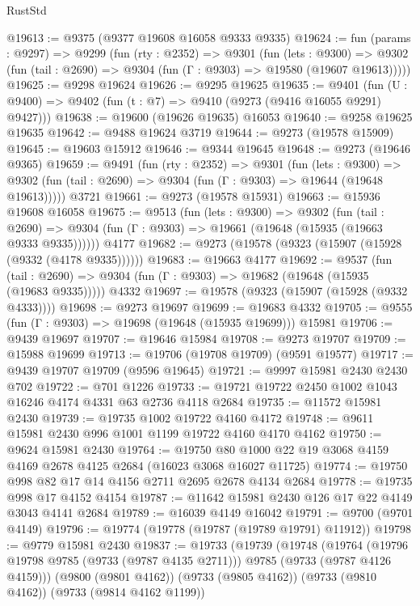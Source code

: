\begin{lexlean}{RustStd}
\begin{coremodule}
@19613 := @9375 (@9377 @19608 @16058 @9333 @9335)
@19624 := fun (params : @9297) =>
  @9299
    (fun (rty : @2352) =>
    @9301
      (fun (lets : @9300) =>
      @9302 (fun (tail : @2690) => @9304 (fun (Γ : @9303) => @19580 (@19607 @19613)))))
@19625 := @9298 @19624
@19626 := @9295 @19625
@19635 := @9401
    (fun (U : @9400) => @9402 (fun (t : @7) => @9410 (@9273 (@9416 @16055 @9291) @9427)))
@19638 := @19600 (@19626 @19635) @16053
@19640 := @9258 @19625 @19635
@19642 := @9488 @19624 @3719
@19644 := @9273 (@19578 @15909)
@19645 := @19603 @15912
@19646 := @9344 @19645
@19648 := @9273 (@19646 @9365)
@19659 := @9491
    (fun (rty : @2352) =>
    @9301
      (fun (lets : @9300) =>
      @9302 (fun (tail : @2690) => @9304 (fun (Γ : @9303) => @19644 (@19648 @19613)))))
    @3721
@19661 := @9273 (@19578 @15931)
@19663 := @15936 @19608 @16058
@19675 := @9513
    (fun (lets : @9300) =>
    @9302
      (fun (tail : @2690) =>
      @9304 (fun (Γ : @9303) => @19661 (@19648 (@15935 (@19663 @9333 @9335))))))
    @4177
@19682 := @9273 (@19578 (@9323 (@15907 (@15928 (@9332 (@4178 @9335))))))
@19683 := @19663 @4177
@19692 := @9537
    (fun (tail : @2690) => @9304 (fun (Γ : @9303) => @19682 (@19648 (@15935 (@19683 @9335)))))
    @4332
@19697 := @19578 (@9323 (@15907 (@15928 (@9332 @4333))))
@19698 := @9273 @19697
@19699 := @19683 @4332
@19705 := @9555 (fun (Γ : @9303) => @19698 (@19648 (@15935 @19699))) @15981
@19706 := @9439 @19697
@19707 := @19646 @15984
@19708 := @9273 @19707
@19709 := @15988 @19699
@19713 := @19706 (@19708 @19709) (@9591 @19577)
@19717 := @9439 @19707 @19709 (@9596 @19645)
@19721 := @9997 @15981 @2430 @2430 @702
@19722 := @701 @1226
@19733 := @19721 @19722 @2450 @1002 @1043 @16246 @4174 @4331 @63 @2736 @4118 @2684
@19735 := @11572 @15981 @2430
@19739 := @19735 @1002 @19722 @4160 @4172
@19748 := @9611 @15981 @2430 @996 @1001 @1199 @19722 @4160 @4170 @4162
@19750 := @9624 @15981 @2430
@19764 := @19750 @80 @1000 @22 @19 @3068 @4159 @4169 @2678 @4125 @2684 (@16023 @3068 @16027 @11725)
@19774 := @19750 @998 @82 @17 @14 @4156 @2711 @2695 @2678 @4134 @2684
@19778 := @19735 @998 @17 @4152 @4154
@19787 := @11642 @15981 @2430 @126 @17 @22 @4149 @3043 @4141 @2684
@19789 := @16039 @4149 @16042
@19791 := @9700 (@9701 @4149)
@19796 := @19774 (@19778 (@19787 (@19789 @19791) @11912))
@19798 := @9779 @15981 @2430
@19837 := @19733
    (@19739
      (@19748
        (@19764 (@19796 @19798 @9785 (@9733 (@9787 @4135 @2711))) @9785 (@9733 (@9787 @4126 @4159)))
        (@9800 (@9801 @4162))
        (@9733 (@9805 @4162))
        (@9733 (@9810 @4162))
        (@9733 (@9814 @4162 @1199))

\end{coremodule}
\end{lexlean}
